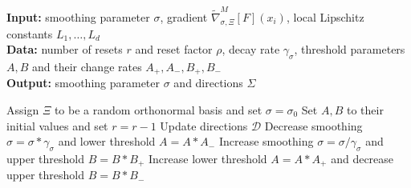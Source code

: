 \begin{algorithm}[!ht]
	\caption{Parameter update}\label{subroutineASGF}
	
	\hspace*{\algorithmicindent} \textbf{Input:} smoothing parameter $\sigma$, gradient $ \widetilde{\nabla}_{\sigma, \Xi}^{M}[F](x_i)$, local Lipschitz constants $L_1,\dots,L_d$\\
	\hspace*{\algorithmicindent} \textbf{Data:} number of resets $r$ and reset factor $\rho$, decay rate $\gamma_\sigma$, threshold parameters $A,B$ and their change rates $A_+, A_-, B_+, B_-$\\
	\hspace*{\algorithmicindent} \textbf{Output:} smoothing parameter $\sigma$ and directions $\Sigma$
	\begin{algorithmic}[1]
		
		\State Assign $\Xi$ to be a random orthonormal basis and set $\sigma = \sigma_0$
		\State Set $A,B$ to their initial values and set $r = r-1$
		\Else
		\State Update directions $\mathcal{D}$
		\State Decrease smoothing $\sigma = \sigma * \gamma_{\sigma}$ and lower threshold $A=A*A_-$
		\State Increase smoothing $\sigma = \sigma / \gamma_{\sigma}$ and upper threshold $B=B*B_+$
		\Else
		\State Increase lower threshold $A=A*A_+$ and decrease upper threshold $B=B*B_-$
		\EndIf
		\EndIf
		
	\end{algorithmic}
\end{algorithm}
